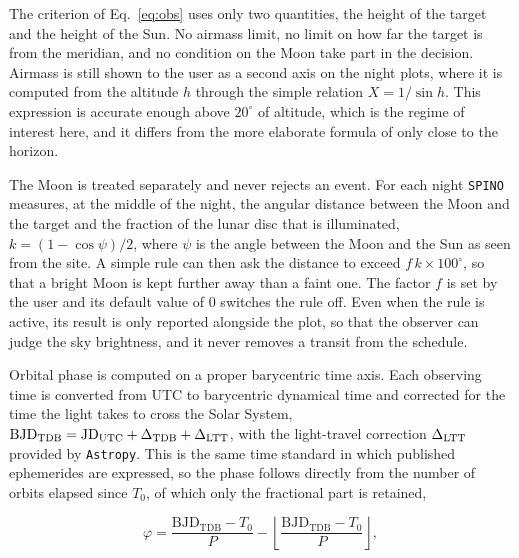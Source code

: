 


The criterion of Eq.~\ref{eq:obs} uses only two quantities, the height of the target and the height of the Sun. No airmass limit, no limit on how far the target is from the meridian, and no condition on the Moon take part in the decision. Airmass is still shown to the user as a second axis on the night plots, where it is computed from the altitude $h$ through the simple relation $X = 1 / \sin h$. This expression is accurate enough above $20^\circ$ of altitude, which is the regime of interest here, and it differs from the more elaborate formula of \citet{kasten1989} only close to the horizon.

The Moon is treated separately and never rejects an event. For each night \texttt{SPINO} measures, at the middle of the night, the angular distance between the Moon and the target and the fraction of the lunar disc that is illuminated, $k = (1 - \cos\psi)/2$, where $\psi$ is the angle between the Moon and the Sun as seen from the site. A simple rule can then ask the distance to exceed $f\,k \times 100^\circ$, so that a bright Moon is kept further away than a faint one. The factor $f$ is set by the user and its default value of $0$ switches the rule off. Even when the rule is active, its result is only reported alongside the plot, so that the observer can judge the sky brightness, and it never removes a transit from the schedule.

Orbital phase is computed on a proper barycentric time axis. Each observing time is converted from UTC to barycentric dynamical time and corrected for the time the light takes to cross the Solar System, $\mathrm{BJD_{TDB}} = \mathrm{JD_{UTC}} + \Delta_{\rm TDB} + \Delta_{\rm LTT}$, with the light-travel correction $\Delta_{\rm LTT}$ provided by \texttt{Astropy}. This is the same time standard in which published ephemerides are expressed, so the phase follows directly from the number of orbits elapsed since $T_0$, of which only the fractional part is retained,

\begin{equation}\label{eq:phase}
\varphi = \frac{\mathrm{BJD_{TDB}} - T_0}{P} - \left\lfloor \frac{\mathrm{BJD_{TDB}} - T_0}{P} \right\rfloor ,
\end{equation}

